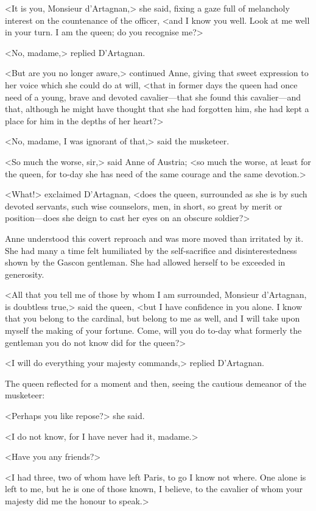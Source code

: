 <It is you, Monsieur d'Artagnan,> she said, fixing a gaze full of melancholy interest on the countenance of the officer, <and I know you well. Look at me well in your turn. I am the queen; do you recognise me?>

<No, madame,> replied D'Artagnan.

<But are you no longer aware,> continued Anne, giving that sweet expression to her voice which she could do at will, <that in former days the queen had once need of a young, brave and devoted cavalier—that she found this cavalier—and that, although he might have thought that she had forgotten him, she had kept a place for him in the depths of her heart?>

<No, madame, I was ignorant of that,> said the musketeer.

<So much the worse, sir,> said Anne of Austria; <so much the worse, at least for the queen, for to-day she has need of the same courage and the same devotion.>

<What!> exclaimed D'Artagnan, <does the queen, surrounded as she is by such devoted servants, such wise counselors, men, in short, so great by merit or position—does she deign to cast her eyes on an obscure soldier?>

Anne understood this covert reproach and was more moved than irritated by it. She had many a time felt humiliated by the self-sacrifice and disinterestedness shown by the Gascon gentleman. She had allowed herself to be exceeded in generosity.

<All that you tell me of those by whom I am surrounded, Monsieur d'Artagnan, is doubtless true,> said the queen, <but I have confidence in you alone. I know that you belong to the cardinal, but belong to me as well, and I will take upon myself the making of your fortune. Come, will you do to-day what formerly the gentleman you do not know did for the queen?>

<I will do everything your majesty commands,> replied D'Artagnan.

The queen reflected for a moment and then, seeing the cautious demeanor of the musketeer:

<Perhaps you like repose?> she said.

<I do not know, for I have never had it, madame.>

<Have you any friends?>

<I had three, two of whom have left Paris, to go I know not where. One alone is left to me, but he is one of those known, I believe, to the cavalier of whom your majesty did me the honour to speak.>

